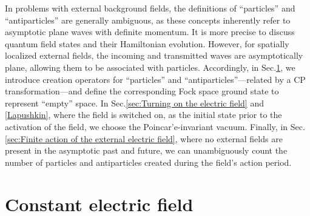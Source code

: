 \documentclass[12pt]{article}
\numberwithin{equation}{section}
\begin{document}
In problems with external background fields, the definitions of ``particles'' and ``antiparticles'' are generally ambiguous, as these concepts inherently refer to asymptotic plane waves with definite momentum. It is more precise to discuss quantum field states and their Hamiltonian evolution. However, for spatially localized external fields, the incoming and transmitted waves are asymptotically plane, allowing them to be associated with particles. Accordingly, in Sec.\ref{sec:Constant electric field}, we introduce creation operators for ``particles'' and ``antiparticles''—related by a CP transformation—and define the corresponding Fock space ground state to represent ``empty'' space. In Sec.\ref{sec:Turning on the electric field} and \ref{Lapushkin}, where the field is switched on, as the initial state prior to the activation of the field, we choose the Poincar'e-invariant vacuum. Finally, in Sec.\ref{sec:Finite action of the external electric field}, where no external fields are present in the asymptotic past and future, we can unambiguously count the number of particles and antiparticles created during the field's action period.

\section{Constant electric field}\label{sec:Constant electric field}
\end{document}
